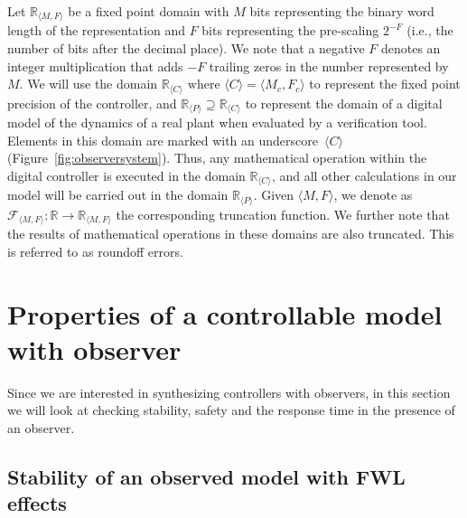 \documentclass[sigconf]{llncs}
\begin{document}
Let $\mathbb{R}_{\langle M,F \rangle}$ be a fixed point domain with $M$ bits
representing the binary word length of the representation and $F$ bits
representing the pre-scaling $2^{-F}$ (i.e., the number of bits after
the decimal place).  We note that a negative $F$ denotes an integer
multiplication that adds $-F$ trailing zeros in the number represented
by~$M$.  We will use the domain $\mathbb{R}_{\langle C \rangle}
\text{ where } \langle C \rangle = \langle M_c,F_c \rangle$ to represent the fixed point
precision of the controller, and $\mathbb{R}_{\langle P \rangle} \supseteq
\mathbb{R}_{\langle C \rangle}$ to represent the domain of a digital model
of the dynamics of a real plant when evaluated by a verification tool. 
Elements in this domain are marked with an underscore~${\langle C \rangle}$
(Figure~\ref{fig:observersystem}).  Thus, any mathematical operation
within the digital controller is executed in the domain $\mathbb{R}_{\langle
C \rangle}$, and all other calculations in our model will be carried out in
the domain $\mathbb{R}_{\langle P \rangle}$.  Given ${\langle M,F \rangle}$,
we denote as $\mathcal{F}_{\langle M,F \rangle} : \mathbb{R} \rightarrow
\mathbb{R}_{\langle M,F \rangle}$ the corresponding truncation function.  We
further note that the results of mathematical operations in these domains
are also truncated.  This is referred to as roundoff errors.

\section{Properties of a controllable model with observer}\label{sec:cof_verification}

Since we are interested in synthesizing controllers with observers, in this
section we will look at checking stability, safety and the response time in
the presence of an observer.


\subsection{Stability of an observed model with FWL effects}\label{sec:cof_fwl_stability}
\end{document}
